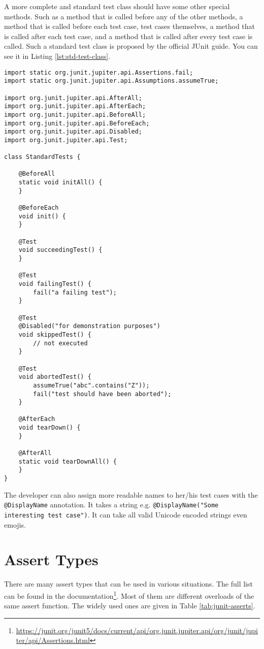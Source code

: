 A more complete and standard test class should have some other special methods. Such as a method that is called before any of the other methods, a method that is called before each test case, test cases themselves, a method that is called after each test case, and a method that is called after every test case is called. Such a standard test class is proposed by the official JUnit guide. You can see it in Listing \ref{lst:std-test-class}.

\begin{lstlisting}[caption={A standard test class.},label=lst:std-test-class]
import static org.junit.jupiter.api.Assertions.fail;
import static org.junit.jupiter.api.Assumptions.assumeTrue;

import org.junit.jupiter.api.AfterAll;
import org.junit.jupiter.api.AfterEach;
import org.junit.jupiter.api.BeforeAll;
import org.junit.jupiter.api.BeforeEach;
import org.junit.jupiter.api.Disabled;
import org.junit.jupiter.api.Test;

class StandardTests {

    @BeforeAll
    static void initAll() {
    }
    
    @BeforeEach
    void init() {
    }
    
    @Test
    void succeedingTest() {
    }
    
    @Test
    void failingTest() {
        fail("a failing test");
    }
    
    @Test
    @Disabled("for demonstration purposes")
    void skippedTest() {
        // not executed
    }
    
    @Test
    void abortedTest() {
        assumeTrue("abc".contains("Z"));
        fail("test should have been aborted");
    }
    
    @AfterEach
    void tearDown() {
    }
    
    @AfterAll
    static void tearDownAll() {
    }
}
\end{lstlisting}

The developer can also assign more readable names to her/his test cases with the \lstinline{@DisplayName} annotation. It takes a string e.g. \lstinline{@DisplayName("Some interesting test case")}. It can take all valid Unicode encoded strings even emojis.

\section{Assert Types}
There are many assert types that can be used in various situations. The full list can be found in the documentation\footnote{\url{https://junit.org/junit5/docs/current/api/org.junit.jupiter.api/org/junit/jupiter/api/Assertions.html}}. Most of them are different overloads of the same assert function. The widely used ones are given in Table \ref{tab:junit-asserts}.

